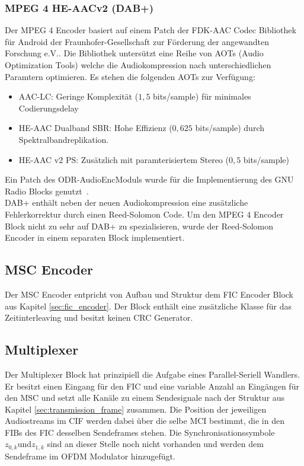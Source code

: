 \subsubsection{MPEG 4 HE-AACv2 (DAB+)}
Der MPEG 4 Encoder basiert auf einem Patch der FDK-AAC Codec Bibliothek für Android der Fraunhofer-Gesellschaft zur Förderung der angewandten Forschung e.V.. Die Bibliothek untersützt eine Reihe von AOTs (Audio Optimization Tools) welche die Audiokompression nach unterschiedlichen Paramtern optimieren. Es stehen die folgenden AOTs zur Verfügung:
\begin{itemize}
\item AAC-LC: Geringe Komplexität ($1,5$ bits/sample) für minimales Codierungsdelay
\item HE-AAC Dualband SBR: Hohe Effizienz ($0,625$ bits/sample) durch Spektralbandreplikation.
\item HE-AAC v2 PS: Zusätzlich mit paramterisiertem Stereo ($0,5$ bits/sample)
\end{itemize}
Ein Patch des \dq ODR-AudioEnc\dq Moduls wurde für die Implementierung des GNU Radio Blocks genutzt~\cite{repo:odr_audioenc}.\\
DAB+ enthält neben der neuen Audiokompression eine zusätzliche Fehlerkorrektur durch einen Reed-Solomon Code. Um den MPEG 4 Encoder Block nicht zu sehr auf DAB+ zu spezialisieren, wurde der Reed-Solomon Encoder in einem separaten Block implementiert.

\subsection{MSC Encoder}
Der MSC Encoder entpricht von Aufbau und Struktur dem FIC Encoder Block aus Kapitel \ref{sec:fic_encoder}. Der Block enthält eine zusätzliche Klasse für das Zeitinterleaving und besitzt keinen CRC Generator. 

\subsection{Multiplexer}
Der Multiplexer Block hat prinzipiell die Aufgabe eines Parallel-Seriell Wandlers. Er besitzt einen Eingang für den FIC und eine variable Anzahl an Eingängen für den MSC und setzt alle Kanäle zu einem Sendesignale nach der Struktur aus Kapitel \ref{sec:transmission_frame} zusammen. Die Position der jeweiligen Audiostreams im CIF werden dabei über die selbe MCI bestimmt, die in den FIBs des FIC desselben Sendeframes stehen. Die Synchronisationssymbole $z_{0,k} \text{und} z_{1,k}$ sind an dieser Stelle noch nicht vorhanden und werden dem Sendeframe im OFDM Modulator hinzugefügt.

